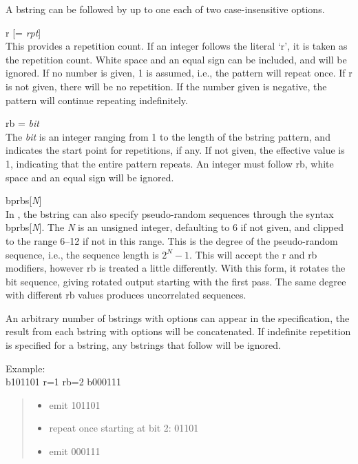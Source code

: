 A bstring can be followed by up to one each of two case-insensitive
options.
\begin{description}
\item{\vt r} [{\vt =} {\it rpt\/}]\\
This provides a repetition count.  If an integer follows the literal
`{\vt r}', it is taken as the repetition count.  White space and an
equal sign can be included, and will be ignored.  If no number is
given, 1 is assumed, i.e., the pattern will repeat once.  If {\vt r}
is not given, there will be no repetition.  If the number given is
negative, the pattern will continue repeating indefinitely.

\item{rb} {\vt =} {\it bit\/}\\
The {\it bit} is an integer ranging from 1 to the length of the
bstring pattern, and indicates the start point for repetitions, if
any.  If not given, the effective value is 1, indicating that the
entire pattern repeats.  An integer must follow {\vt rb}, white space
and an equal sign will be ignored.

\item{\vt bprbs}[{\it N\/}]\\
In {\WRspice}, the bstring can also specify pseudo-random sequences
through the syntax {\vt bprbs}[{\it N\/}].  The {\it N} is an unsigned
integer, defaulting to 6 if not given, and clipped to the range 6--12
if not in this range.  This is the degree of the pseudo-random
sequence, i.e., the sequence length is $2^N-1$.  This will accept the
{\vt r} and {\vt rb} modifiers, however {\vt rb} is treated a little
differently.  With this form, it rotates the bit sequence, giving
rotated output starting with the first pass.  The same degree with
different {\vt rb} values produces uncorrelated sequences.
\end{description}

An arbitrary number of bstrings with options can appear in the
specification, the result from each bstring with options will be
concatenated.  If indefinite repetition is specified for a bstring,
any bstrings that follow will be ignored.

Example:\\
{\vt b101101 r=1 rb=2 b000111}
\begin{quote}
\begin{itemize}
\item{emit 101101}
\item{repeat once starting at bit 2: 01101}
\item{emit 000111}
\end{itemize}
\end{quote}

